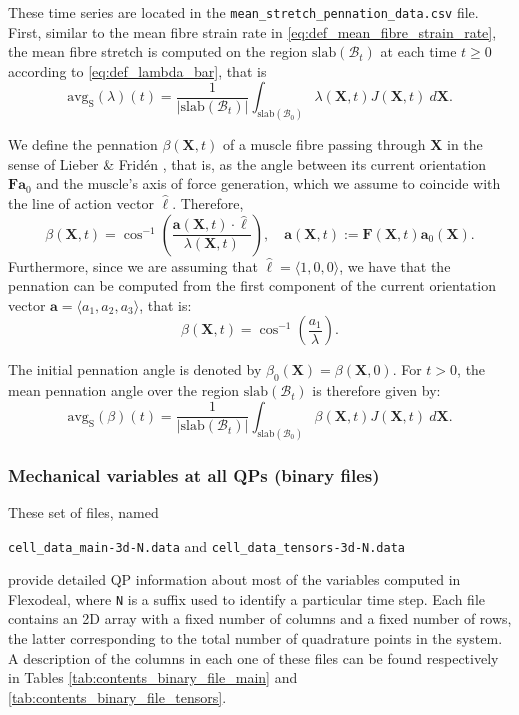 \documentclass{sfuthesis}
\numberwithin{equation}{section}
\numberwithin{figure}{chapter}
\numberwithin{table}{chapter}
\theoremstyle{definition}
\def\*#1{{\mathbf{#1}}} %
\newcommand{\B}{\mathcal{B}}
\begin{document}
These time series are located in the \texttt{mean\_stretch\_pennation\_data.csv} file. First, similar to the mean fibre strain rate in \eqref{eq:def_mean_fibre_strain_rate}, the mean fibre stretch is computed on the region $\mathrm{slab}(\B_t)$ at each time $t \geq 0$ according to \eqref{eq:def_lambda_bar}, that is
\begin{equation} \label{eq:def_mean_fibre_stretch}
    \mathrm{avg}_\mathrm{S}(\lambda)(t) = \dfrac{1}{|\mathrm{slab}(\B_t)|} \int_{\mathrm{slab}(\B_0)} \lambda(\*X,t) J(\*X,t) \ d\*X.
\end{equation}

We define the pennation $\beta(\*X,t)$ of a muscle fibre passing through $\*X$  in the sense of Lieber \& Frid\'{e}n \cite{LieberFriden2000}, that is, as the angle between its current orientation $\*F \*a_0$ and the muscle's axis of force generation, which we assume to coincide with the line of action vector $\widehat{\bm{\ell}}$. Therefore,
\begin{equation}
    \beta(\*X,t) = \cos^{-1} \left( \dfrac{\*a(\*X,t) \cdot \widehat{\bm{\ell}}}{\lambda(\*X,t)} \right), \quad \*a(\*X,t) := \*F(\*X,t) \*a_0(\*X).
\end{equation}
Furthermore, since we are assuming that $\widehat{\bm{\ell}} = \langle 1,0,0 \rangle$, we have that the pennation can be computed from the first component of the current orientation vector $\*a = \langle a_1,a_2,a_3 \rangle$, that is:
\begin{equation}
    \beta(\*X,t) = \cos^{-1} \left( \dfrac{a_1}{\lambda} \right).
\end{equation}

The initial pennation angle is denoted by $\beta_0(\*X) = \beta(\*X,0)$. For $t>0$, the mean pennation angle over the region $\mathrm{slab}(\B_t)$ is therefore given by:
\begin{equation} \label{eq:def_mean_fibre_pennation}
    \mathrm{avg}_\mathrm{S}(\beta)(t) = \dfrac{1}{|\mathrm{slab}(\B_t)|} \int_{\mathrm{slab}(\B_0)} \beta(\*X,t) J(\*X,t) \ d\*X.
\end{equation}

\subsubsection{Mechanical variables at all QPs (binary files)} \label{sec:binary_files}

These set of files, named 
\begin{center}
    \texttt{cell\_data\_main-3d-N.data} and \texttt{cell\_data\_tensors-3d-N.data}    
\end{center}
provide detailed QP information about most of the variables computed in Flexodeal, where \texttt{N} is a suffix used to identify a particular time step. Each file contains an 2D array with a fixed number of columns and a fixed number of rows, the latter corresponding to the total number of quadrature points in the system. A description of the columns in each one of these files can be found respectively in Tables \ref{tab:contents_binary_file_main} and \ref{tab:contents_binary_file_tensors}.
\end{document}
